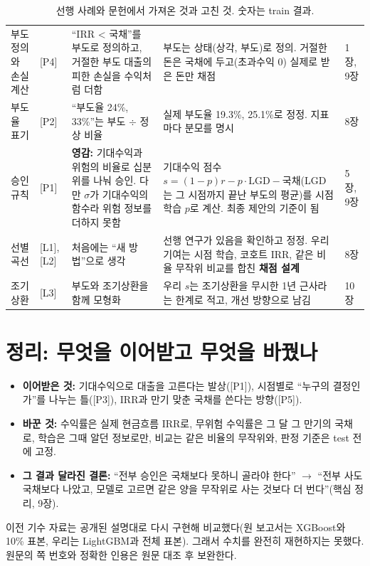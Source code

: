 \begin{table}[H]
\begin{tabularx}{\linewidth}{@{}p{20mm}p{12mm}LLp{12mm}@{}}
부도 정의와 손실 계산 & [P4] & ``IRR < 국채''를 부도로 정의하고, 거절한 부도 대출의 피한 손실을 수익처럼 더함 & 부도는 상태(상각, 부도)로 정의. 거절한 돈은 국채에 두고(초과수익 0) 실제로 받은 돈만 채점 & 1장, 9장\\
부도율 표기 & [P2] & ``부도율 24\%, 33\%''는 부도 \ensuremath{\div} 정상 비율 & 실제 부도율 19.3\%, 25.1\%로 정정. 지표마다 분모를 명시 & 8장\\
승인 규칙 & [P1] & \textbf{영감:} 기대수익과 위험의 비율로 십분위를 나눠 승인. 다만 $\sigma$가 기대수익의 함수라 위험 정보를 더하지 못함 & 기대수익 점수 $s=(1-p)r-p\cdot\mathrm{LGD}-$국채(LGD는 그 시점까지 끝난 부도의 평균)를 시점 학습 $p$로 계산. 최종 제안의 기준이 됨 & 5장, 9장\\
선별 곡선 & [L1], [L2] & 처음에는 ``새 방법''으로 생각 & 선행 연구가 있음을 확인하고 정정. 우리 기여는 시점 학습, 코호트 IRR, 같은 비율 무작위 비교를 합친 \textbf{채점 설계} & 8장\\
조기상환 & [L3] & 부도와 조기상환을 함께 모형화 & 우리 $s$는 조기상환을 무시한 1년 근사라는 한계로 적고, 개선 방향으로 남김 & 10장\\\bottomrule
\end{tabularx}
\caption{선행 사례와 문헌에서 가져온 것과 고친 것. 숫자는 train 결과.}
\end{table}

\section*{정리: 무엇을 이어받고 무엇을 바꿨나}
\begin{itemize}[leftmargin=*]
\item \textbf{이어받은 것:} 기대수익으로 대출을 고른다는 발상([P1]), 시점별로 ``누구의 결정인가''를 나누는 틀([P3]), IRR과 만기 맞춘 국채를 쓴다는 방향([P5]).
\item \textbf{바꾼 것:} 수익률은 실제 현금흐름 IRR로, 무위험 수익률은 그 달 그 만기의 국채로, 학습은 그때 알던 정보로만, 비교는 같은 비율의 무작위와, 판정 기준은 test 전에 고정.
\item \textbf{그 결과 달라진 결론:} ``전부 승인은 국채보다 못하니 골라야 한다'' \ensuremath{\to} ``전부 사도 국채보다 나았고, 모델로 고르면 같은 양을 무작위로 사는 것보다 더 번다''(핵심 정리, 9장).
\end{itemize}
\begin{warnbox}[한계]
이전 기수 자료는 공개된 설명대로 다시 구현해 비교했다(원 보고서는 XGBoost와 10\% 표본, 우리는 LightGBM과 전체 표본). 그래서 수치를 완전히 재현하지는 못했다. 원문의 쪽 번호와 정확한 인용은 원문 대조 후 보완한다.
\end{warnbox}

